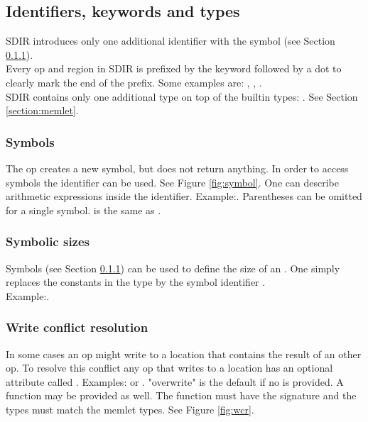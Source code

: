 \subsection{Identifiers, keywords and types}
SDIR introduces only one additional identifier with the symbol \codeword{\$} (see Section \ref{section:symbol}).\\
Every op and region in SDIR is prefixed by the keyword  followed by a dot to clearly mark the end of the prefix. Some examples are: , , . \\
SDIR contains only one additional type on top of the builtin types: . See Section \ref{section:memlet}. 

\subsubsection{Symbols} \label{section:symbol}
The op  creates a new symbol, but does not return anything. In order to access symbols the identifier \codeword{\$()} can be used. See Figure \ref{fig:symbol}. One can describe arithmetic expressions inside the identifier. Example:. Parentheses can be omitted for a single symbol.  is the same as .

 \subsubsection{Symbolic sizes}
 Symbols (see Section \ref{section:symbol}) can be used to define the size of an . One simply replaces the constants in the type by the symbol identifier \codeword{\$()}.\\
 Example:.
 
 \subsubsection{Write conflict resolution}
In some cases an op might write to a location that contains the result of an other op. To resolve this conflict any op that writes to a location has an optional attribute called . Examples: or . "overwrite" is the default if no  is provided. A function may be provided as well. The function must have the signature  and the types must match the memlet types. See Figure \ref{fig:wcr}.

